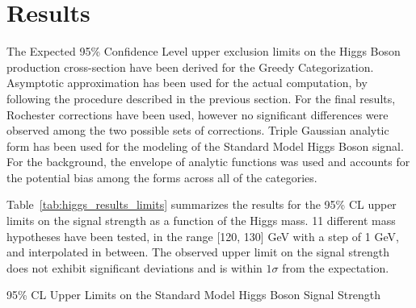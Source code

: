 \section{Results} \label{section:higgs_results}
The Expected 95\% Confidence Level upper exclusion limits on the Higgs Boson production cross-section have been derived for the Greedy Categorization. Asymptotic approximation has been used for the actual computation, by following the procedure described in the previous section. For the final results, Rochester corrections have been used, however no significant differences were observed among the two possible sets of corrections. Triple Gaussian analytic form has been used for the modeling of the Standard Model Higgs Boson signal. For the background, the envelope of analytic functions was used and accounts for the potential bias among the forms across all of the categories.

Table~\ref{tab:higgs_results_limits} summarizes the results for the 95\% CL upper limits on the signal strength as a function of the Higgs mass. 11 different mass hypotheses have been tested, in the range [120, 130] GeV with a step of 1 GeV, and interpolated in between. The observed upper limit on the signal strength does not exhibit significant deviations and is within $1\sigma$ from the expectation.
\begin{table}[htbp]
    \centering
    \caption{95\% CL Upper Limits on the Standard Model Higgs Boson Signal Strength}
    
    \label{tab:higgs_results_limits}
\end{table}


